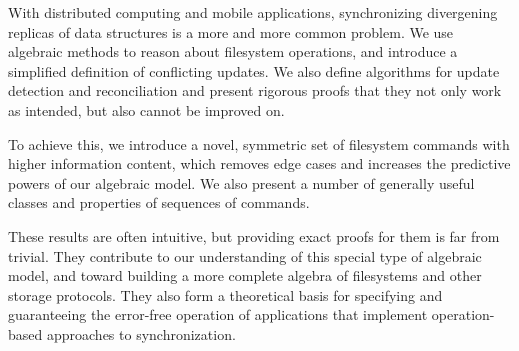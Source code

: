 
With distributed computing and mobile applications,
synchronizing divergening replicas of data structures is a more and more common problem.
We use algebraic methods to reason about filesystem operations, 
and introduce a simplified definition of conflicting updates.
We also define algorithms for update detection and reconciliation
and present rigorous proofs that they not only work as intended,
but also cannot be improved on.

To achieve this, we introduce a novel, symmetric set of filesystem commands
with higher information content,
which removes edge cases
and increases the predictive powers of our algebraic model.
We also present a number of generally useful classes and properties
of sequences of commands.

These results are often intuitive,
but providing exact proofs for them is far from trivial.
They contribute to our understanding of this special type of algebraic model,
and toward building a more complete algebra
of filesystems and other storage protocols.
They also form a theoretical basis for
specifying
and guaranteeing the error-free operation
of applications that implement operation-based approaches to synchronization.
